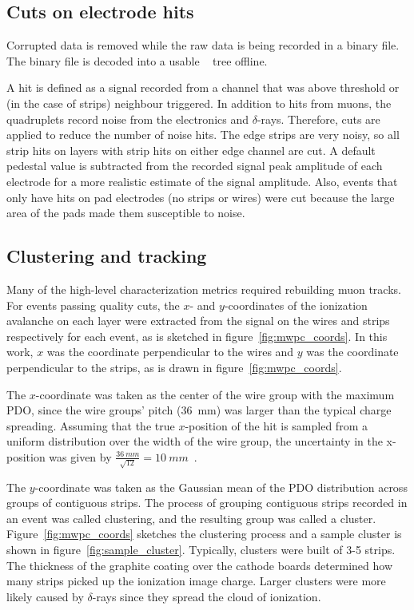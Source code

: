 \subsection{Cuts on electrode hits}
Corrupted data is removed while the raw data is being recorded in a binary file. The binary file is decoded into a usable ~\cite{ROOT_paper} tree offline. 

A hit is defined as a signal recorded from a channel that was above threshold or (in the case of strips) neighbour triggered. In addition to hits from muons, the quadruplets record noise from the electronics and $\delta$-rays. Therefore, cuts are applied to reduce the number of noise hits. The edge strips are very noisy, so all strip hits on layers with strip hits on either edge channel are cut. A default pedestal value is subtracted from the recorded signal peak amplitude of each electrode for a more realistic estimate of the signal amplitude. Also, events that only have hits on pad electrodes (no strips or wires) were cut because the large area of the pads made them susceptible to noise.

\subsection{Clustering and tracking}

Many of the high-level characterization metrics required rebuilding muon tracks. For events passing quality cuts, the $x$- and $y$-coordinates of the ionization avalanche on each layer were extracted from the signal on the wires and strips respectively for each event, as is sketched in figure~\ref{fig:mwpc_coords}. In this work, $x$ was the coordinate perpendicular to the wires and $y$ was the coordinate perpendicular to the strips, as is drawn in figure~\ref{fig:mwpc_coords}.

The $x$-coordinate was taken as the center of the wire group with the maximum PDO, since the wire groups' pitch (\SI{36}{\milli\meter}) was larger than the typical charge spreading. Assuming that the true $x$-position of the hit is sampled from a uniform distribution over the width of the wire group, the uncertainty in the x-position was given by $\frac{36~mm}{\sqrt{12}} = 10~mm$~\cite{Sauli:117989}.

The $y$-coordinate was taken as the Gaussian mean of the PDO distribution across groups of contiguous strips. The process of grouping contiguous strips recorded in an event was called clustering, and the resulting group was called a cluster. Figure~\ref{fig:mwpc_coords} sketches the clustering process and a sample cluster is shown in figure~\ref{fig:sample_cluster}. Typically, clusters were built of 3-5 strips. The thickness of the graphite coating over the cathode boards determined how many strips picked up the ionization image charge. Larger clusters were more likely caused by $\delta$-rays since they spread the cloud of ionization. 


